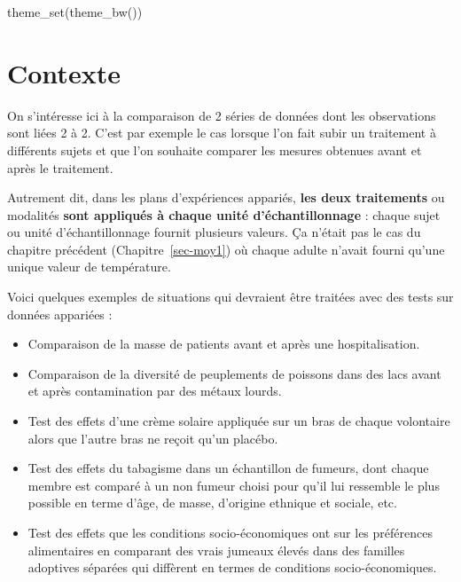 \documentclass[
  french,
  a4paper,
  DIV=11,
  numbers=noendperiod,
  oneside]{scrreprt}
\newenvironment{Shaded}{}{}
\newcommand{\FunctionTok}[1]{\textcolor[rgb]{0.44,0.26,0.76}{#1}}
\newcommand{\NormalTok}[1]{\textcolor[rgb]{0.14,0.16,0.18}{#1}}
\providecommand{\tightlist}{%
  \setlength{\itemsep}{0pt}\setlength{\parskip}{0pt}}
\begin{document}
\begin{Shaded}
\begin{Highlighting}[]
\FunctionTok{theme\_set}\NormalTok{(}\FunctionTok{theme\_bw}\NormalTok{())}
\end{Highlighting}
\end{Shaded}

\section{Contexte}\label{contexte-1}

On s'intéresse ici à la comparaison de 2 séries de données dont les
observations sont liées 2 à 2. C'est par exemple le cas lorsque l'on
fait subir un traitement à différents sujets et que l'on souhaite
comparer les mesures obtenues avant et après le traitement.

Autrement dit, dans les plans d'expériences appariés, \textbf{les deux
traitements} ou modalités \textbf{sont appliqués à chaque unité
d'échantillonnage} : chaque sujet ou unité d'échantillonnage fournit
plusieurs valeurs. Ça n'était pas le cas du chapitre précédent
(Chapitre~\ref{sec-moy1}) où chaque adulte n'avait fourni qu'une unique
valeur de température.

Voici quelques exemples de situations qui devraient être traitées avec
des tests sur données appariées :

\begin{itemize}
\tightlist
\item
  Comparaison de la masse de patients avant et après une
  hospitalisation.
\item
  Comparaison de la diversité de peuplements de poissons dans des lacs
  avant et après contamination par des métaux lourds.
\item
  Test des effets d'une crème solaire appliquée sur un bras de chaque
  volontaire alors que l'autre bras ne reçoit qu'un placébo.
\item
  Test des effets du tabagisme dans un échantillon de fumeurs, dont
  chaque membre est comparé à un non fumeur choisi pour qu'il lui
  ressemble le plus possible en terme d'âge, de masse, d'origine
  ethnique et sociale, etc.
\item
  Test des effets que les conditions socio-économiques ont sur les
  préférences alimentaires en comparant des vrais jumeaux élevés dans
  des familles adoptives séparées qui diffèrent en termes de conditions
  socio-économiques.
\end{itemize}
\end{document}
